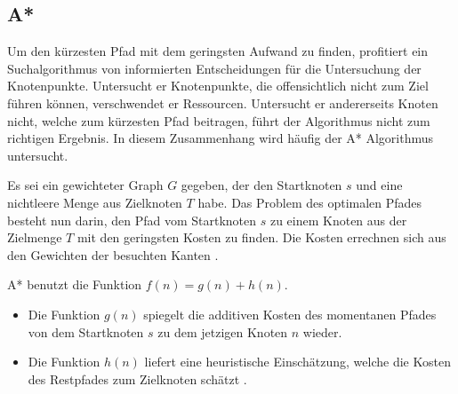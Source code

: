\subsection{A*}
Um den kürzesten Pfad mit dem geringsten Aufwand zu finden, profitiert ein Suchalgorithmus von informierten Entscheidungen für die Untersuchung der Knotenpunkte. Untersucht er Knotenpunkte, die offensichtlich nicht zum Ziel führen können, verschwendet er Ressourcen. Untersucht er andererseits Knoten nicht, welche zum kürzesten Pfad beitragen, führt der Algorithmus nicht zum richtigen Ergebnis. In diesem Zusammenhang wird häufig der A* Algorithmus untersucht.

Es sei ein gewichteter Graph $G$ gegeben, der den Startknoten $s$ und eine nichtleere Menge aus Zielknoten $T$ habe. Das Problem des optimalen Pfades besteht nun darin, den Pfad vom Startknoten $s$ zu einem Knoten aus der Zielmenge $T$ mit den geringsten Kosten zu finden. %
Die Kosten errechnen sich aus den Gewichten der besuchten Kanten \cite{RinaDechterandJudeaPearl.1983}.

A* benutzt die Funktion $f(n) = g(n) + h(n)$.
\begin{itemize}
\item Die Funktion $g(n)$ spiegelt die additiven Kosten des momentanen Pfades von dem Startknoten $s$ zu dem jetzigen Knoten $n$ wieder.
\item Die Funktion $h(n)$ liefert eine heuristische Einschätzung, welche die Kosten des Restpfades zum Zielknoten schätzt \cite{RinaDechterandJudeaPearl.1983}.
\end{itemize}

